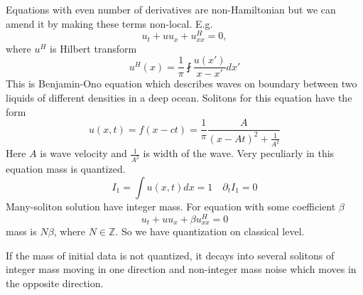 \documentclass[12pt]{article}
\begin{document}
Equations with even number of derivatives are non-Hamiltonian but we can amend it by making these
terms non-local. E.g.
\begin{equation}
  \label{eq:14}
  u_{t}+u u_{x}+u^{H}_{xx}=0,
\end{equation}
where $u^{H}$ is Hilbert transform
\begin{equation}
  \label{eq:15}
  u^{H}(x)=\frac{1}{\pi} \fint \frac{u(x')}{x-x'}dx' 
\end{equation}
This is Benjamin-Ono equation which describes waves on boundary between two liquids of different
densities in a deep ocean. Solitons for this equation have the form
\begin{equation}
  \label{eq:16}
  u(x,t)=f(x-ct)=\frac{1}{\pi} \frac{A}{(x-A t)^{2}+\frac{1}{A^{2}}}
\end{equation}
Here $A$ is wave velocity and $\frac{1}{A^{2}}$ is width of the wave. Very peculiarly in this
equation mass is quantized.
\begin{equation}
  \label{eq:17}
  I_{1}=\int u(x,t) dx =1\quad \partial_{t} I_{1}=0
\end{equation}
Many-soliton solution have integer mass. For equation with some coefficient $\beta$
\begin{equation}
  \label{eq:18}
   u_{t}+u u_{x}+\beta u^{H}_{xx}=0
\end{equation}
mass is $N\beta$, where $N\in \mathbb{Z}$. So we have quantization on classical level. 

If the mass of initial data is not quantized, it decays into several solitons of integer mass moving
in one direction and non-integer mass noise which moves in the opposite direction. 
\end{document}
